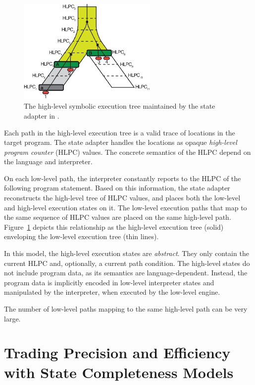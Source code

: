 \begin{figure}
  \centering
  \includegraphics[width=0.6\textwidth]{figures/chef/hl-tree}
  \caption{The high-level symbolic execution tree maintained by the state adapter in \chef.}
  \label{fig:chef:hl-tree}
\end{figure}

Each path in the high-level execution tree is a valid trace of locations in the target program.
%
The state adapter handles the locations as opaque \emph{high-level program counter} (HLPC) values.  The concrete semantics of the HLPC depend on the language and interpreter.

On each low-level path, the interpreter constantly reports to \chef the HLPC of the following program statement.
%
Based on this information, the state adapter reconstructs the high-level tree of HLPC values, and places both the low-level and high-level execution states on it.
%
The low-level execution paths that map to the same sequence of HLPC values are placed on the same high-level path.
%
Figure~\ref{fig:chef:hl-tree} depicts this relationship as the high-level execution tree (solid) enveloping the low-level execution tree (thin lines).

In this model, the high-level execution states are \emph{abstract}.
%
They only contain the current HLPC and, optionally, a current path condition.
%
The high-level states do not include program data, as its semantics are language-dependent.  Instead, the program data is implicitly encoded in low-level interpreter states and manipulated by the interpreter, when executed by the low-level engine.

The number of low-level paths mapping to the same high-level path can be very large.


\section{Trading Precision and Efficiency with State Completeness Models}

